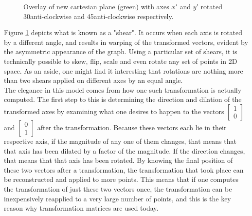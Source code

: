 \documentclass[12pt, a4paper]{article}
\begin{document}
\begin{figure}[H]
    \caption{ Overlay of new cartesian plane (green) with axes $x'$ and $y'$
        rotated 30\textdegree\space anti-clockwise and 45\textdegree\space anti-clockwise respectively. }
    \label{2d_axis_shear}
\end{figure}

Figure \ref{2d_axis_shear} depicts what is known as a "shear". It occurs when
each axis is rotated by a different angle, and results in warping of the
transformed vectors, evident by the asymmetric appearance of the graph. Using a
particular set of shears, it is technically possible to skew, flip, scale and
even rotate any set of points in 2D space. As an aside, one might find it
interesting that rotations are nothing more than two shears applied on different
axes by an equal angle. \\ 

The elegance in this model comes from how one such transformation is actually
computed. The first step to this is determining the direction and dilation of
the transformed axes by examining what one desires to happen to the vectors
$\begin{bmatrix} 1 \\
        0\end{bmatrix}$ and $\begin{bmatrix} 0 \\
        1\end{bmatrix}$ after the transformation. Because these vectors each lie
in their respective axis, if the magnitude of any one of them changes, that
means that that axis has been dilated by a factor of the magnitude. If the
direction changes, that means that that axis has been rotated. By knowing the
final position of these two vectors after a transformation, the transformation
that took place can be reconstructed and applied to more points. This means that
if one computes the transformation of just these two vectors once, the
transformation can be inexpensively reapplied to a very large number of points,
and this is the key reason why transformation matrices are used today.
\end{document}
